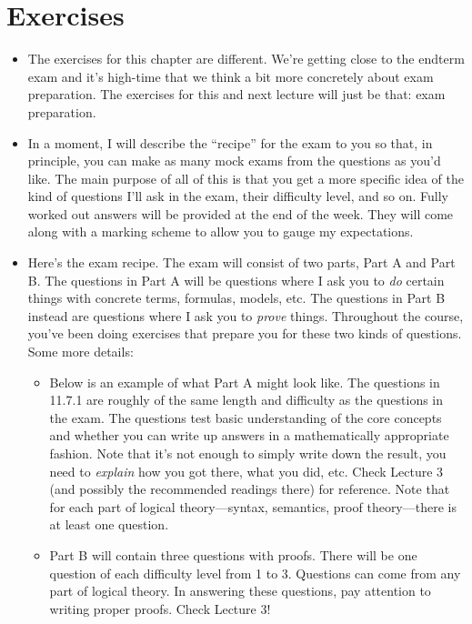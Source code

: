 \section{Exercises}

\begin{itemize}
\item The exercises for this chapter are different. We're getting
 close to the endterm exam and it's high-time that we think a bit more
 concretely about exam preparation. The exercises for this and next lecture will just be that: exam preparation.

 \item In a moment, I will describe the ``recipe'' for the exam to you
so that, in principle, you can make as many mock exams from the
questions as you'd like. The main purpose of all of this is that you
get a more specific idea of the kind of questions I'll ask in the
exam, their difficulty level, and so on. Fully worked out answers will be
provided at the end of the week. They will come along with a marking
scheme to allow you to gauge my expectations.

\item Here's the exam recipe. The exam will consist of two parts, Part A and Part
  B. The questions in Part A will be questions where I ask you to
  \emph{do} certain things with concrete terms, formulas, models,
  etc. The questions in Part B instead are questions where I ask you
  to \emph{prove} things. Throughout the course, you've been
  doing exercises that prepare you for these two kinds of
  questions. Some more details:

  \begin{itemize}

    \item Below is an example of what Part A might look like. The
      questions in 11.7.1 are roughly of the same length and
      difficulty as the questions in the exam. The questions test
      basic understanding of the core concepts and whether you can
      write up answers in a mathematically appropriate fashion. Note
      that it's not enough to simply write down the result, you need
      to \emph{explain} how you got there, what you did, etc. Check
      Lecture 3 (and possibly the recommended readings there) for
      reference. Note that for each part of logical theory---syntax,
      semantics, proof theory---there is at least one question.

    \item Part B will contain three questions with proofs. There will
      be one question of each difficulty level from 1 to 3. Questions
      can come from any part of logical theory. In answering these
      questions, pay attention to writing proper proofs. Check Lecture
      3! 


\end{itemize}
\end{itemize}
